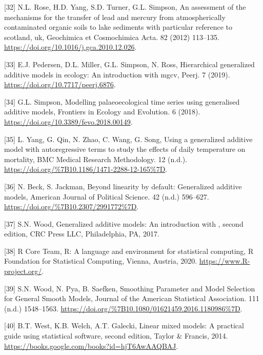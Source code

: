 \documentclass[
]{article}
\begin{document}
\leavevmode\hypertarget{ref-rose2012}{}%
{[}32{]} N.L. Rose, H.D. Yang, S.D. Turner, G.L. Simpson, An assessment of the mechanisms for the transfer of lead and mercury from atmospherically contaminated organic soils to lake sediments with particular reference to scotland, uk, Geochimica et Cosmochimica Acta. 82 (2012) 113--135. \url{https://doi.org/10.1016/j.gca.2010.12.026}.

\leavevmode\hypertarget{ref-pedersen2019}{}%
{[}33{]} E.J. Pedersen, D.L. Miller, G.L. Simpson, N. Ross, Hierarchical generalized additive models in ecology: An introduction with mgcv, Peerj. 7 (2019). \url{https://doi.org/10.7717/peerj.6876}.

\leavevmode\hypertarget{ref-simpson2018}{}%
{[}34{]} G.L. Simpson, Modelling palaeoecological time series using generalised additive models, Frontiers in Ecology and Evolution. 6 (2018). \url{https://doi.org/10.3389/fevo.2018.00149}.

\leavevmode\hypertarget{ref-yang2012}{}%
{[}35{]} L. Yang, G. Qin, N. Zhao, C. Wang, G. Song, Using a generalized additive model with autoregressive terms to study the effects of daily temperature on mortality, BMC Medical Research Methodology. 12 (n.d.). \url{https://doi.org/\%7B10.1186/1471-2288-12-165\%7D}.

\leavevmode\hypertarget{ref-beck1998}{}%
{[}36{]} N. Beck, S. Jackman, Beyond linearity by default: Generalized additive models, American Journal of Political Science. 42 (n.d.) 596--627. \url{https://doi.org/\%7B10.2307/2991772\%7D}.

\leavevmode\hypertarget{ref-wood2017}{}%
{[}37{]} S.N. Wood, Generalized additive models: An introduction with , second edition, CRC Press LLC, Philadelphia, PA, 2017.

\leavevmode\hypertarget{ref-r}{}%
{[}38{]} R Core Team, R: A language and environment for statistical computing, R Foundation for Statistical Computing, Vienna, Austria, 2020. \url{https://www.R-project.org/}.

\leavevmode\hypertarget{ref-wood2016}{}%
{[}39{]} S.N. Wood, N. Pya, B. Saefken, Smoothing Parameter and Model Selection for General Smooth Models, Journal of the American Statistical Association. 111 (n.d.) 1548--1563. \url{https://doi.org/\%7B10.1080/01621459.2016.1180986\%7D}.

\leavevmode\hypertarget{ref-west2014}{}%
{[}40{]} B.T. West, K.B. Welch, A.T. Galecki, Linear mixed models: A practical guide using statistical software, second edition, Taylor \& Francis, 2014. \url{https://books.google.com/books?id=hjT6AwAAQBAJ}.
\end{document}
